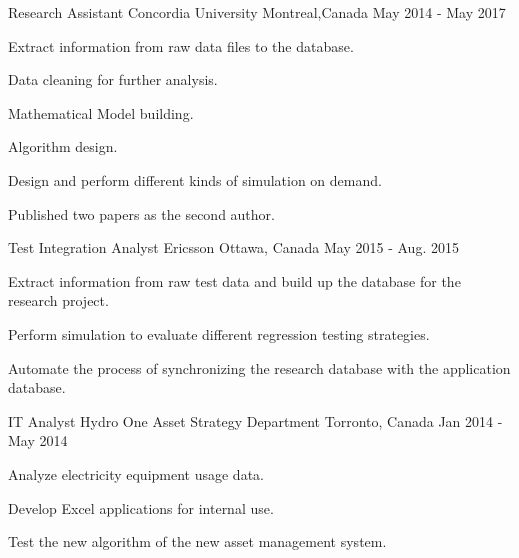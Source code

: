 \documentclass[11pt, a4paper]{awesome-cv} %
\begin{document}
\begin{cventries}
	\cventry
	{Research Assistant} %
	{Concordia University} %
	{Montreal,Canada} %
	{May 2014 - May 2017} %
	{ %
		\begin{cvitems}
			\item {Extract information from raw data files to the database.}
			\item {Data cleaning for further analysis.}
			\item {Mathematical Model building.}
			\item {Algorithm design.}
			\item {Design and perform different kinds of simulation on demand.}
			\item {Published two papers as the second author.}
		\end{cvitems}
	}
	
	


	
	
	\cventry
	{Test Integration Analyst} %
	{Ericsson} %
	{Ottawa, Canada} %
	{May 2015 - Aug. 2015} %
	{ %
		\begin{cvitems}
			\item {Extract information from raw test data and build up the database for the research project.}
			\item {Perform simulation to evaluate different regression testing strategies.}
			\item {Automate the process of synchronizing the research database with the application database.}
		\end{cvitems}
	}
	
	
	
	


	
	
	\cventry
	{IT Analyst} %
	{Hydro One Asset Strategy Department} %
	{Torronto, Canada} %
	{Jan 2014 - May 2014} %
	{ %
		\begin{cvitems}
			\item {Analyze electricity equipment usage data.}
			\item {Develop Excel applications for internal use.}
			\item {Test the new algorithm of the new asset management system.}
		\end{cvitems}
	}
	

\end{cventries}
\end{document}
